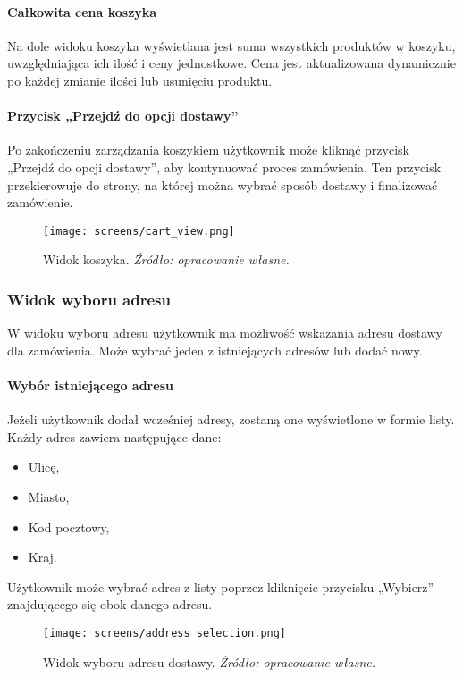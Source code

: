 \documentclass[12pt,a4paper,oneside]{article}
\theoremstyle{definition}
\numberwithin{equation}{section}
\begin{document}
\paragraph{Całkowita cena koszyka}
Na dole widoku koszyka wyświetlana jest suma wszystkich produktów w koszyku, uwzględniająca ich ilość i ceny jednostkowe. Cena jest aktualizowana dynamicznie po każdej zmianie ilości lub usunięciu produktu.

\paragraph{Przycisk „Przejdź do opcji dostawy”}
Po zakończeniu zarządzania koszykiem użytkownik może kliknąć przycisk „Przejdź do opcji dostawy”, aby kontynuować proces zamówienia. Ten przycisk przekierowuje do strony, na której można wybrać sposób dostawy i finalizować zamówienie.

\begin{figure}[H]
    \centering
    \texttt{[image: screens/cart\_view.png]}
    \caption{Widok koszyka. \emph{Źródło: opracowanie własne.}}
    \label{fig:cart_view}
\end{figure}





\newpage
\subsubsection{Widok wyboru adresu}
W widoku wyboru adresu użytkownik ma możliwość wskazania adresu dostawy dla zamówienia. Może wybrać jeden z istniejących adresów lub dodać nowy.

\paragraph{Wybór istniejącego adresu}
Jeżeli użytkownik dodał wcześniej adresy, zostaną one wyświetlone w formie listy. Każdy adres zawiera następujące dane:
\begin{itemize}
    \item Ulicę,
    \item Miasto,
    \item Kod pocztowy,
    \item Kraj.
\end{itemize}
Użytkownik może wybrać adres z listy poprzez kliknięcie przycisku „Wybierz” znajdującego się obok danego adresu.
\begin{figure}[H]
    \centering
    \texttt{[image: screens/address\_selection.png]}
    \caption{Widok wyboru adresu dostawy. \emph{Źródło: opracowanie własne.}}
    \label{fig:address_selection}
\end{figure}
\end{document}
